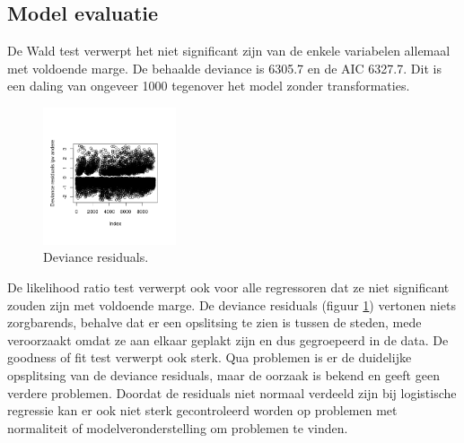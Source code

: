 \documentclass[a4paper,kulak]{kulakarticle} %
\begin{document}
\subsection{Model evaluatie}

De Wald test verwerpt het niet significant zijn van de enkele variabelen allemaal  met voldoende marge.
De behaalde deviance is 6305.7 en de AIC 6327.7.
Dit is een daling van ongeveer 1000 tegenover het model zonder transformaties.
\begin{figure}
	\begin{center}
		\includegraphics[width=0.35\textwidth]{Rplot.png}
	\end{center}
	\caption{Deviance residuals.}
	\label{fig:rpn}
\end{figure}
De likelihood ratio test verwerpt ook voor alle regressoren dat ze niet significant zouden zijn met voldoende marge.
De deviance residuals (figuur \ref{fig:rpn}) vertonen niets zorgbarends, behalve dat er een opslitsing te zien is tussen de steden, mede veroorzaakt omdat ze aan elkaar geplakt zijn en dus gegroepeerd in de data.
De goodness of fit test verwerpt ook sterk.
Qua problemen is er de duidelijke opsplitsing van de deviance residuals, maar de oorzaak is bekend en geeft geen verdere problemen.
Doordat de residuals niet normaal verdeeld zijn bij logistische regressie kan er ook niet sterk gecontroleerd worden op problemen met normaliteit of modelveronderstelling om problemen te vinden.
\end{document}
